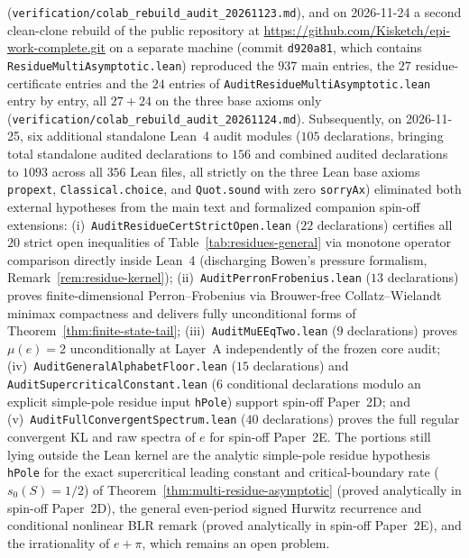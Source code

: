 \documentclass[11pt]{article}
\theoremstyle{definition}
\theoremstyle{remark}
\begin{document}
(\texttt{verification/\allowbreak colab\_\allowbreak rebuild\_\allowbreak audit\_\allowbreak 20261123.md}), and on 2026-11-24 a second clean-clone rebuild of the public repository at \url{https://github.com/Kisketch/epi-work-complete.git} on a separate machine (commit \texttt{d920a81}, which contains \texttt{ResidueMultiAsymptotic.lean}) reproduced the $937$ main entries, the $27$ residue-certificate entries and the $24$ entries of \texttt{AuditResidueMultiAsymptotic.lean} entry by entry, all $27+24$ on the three base axioms only (\texttt{verification/\allowbreak colab\_\allowbreak rebuild\_\allowbreak audit\_\allowbreak 20261124.md}). Subsequently, on 2026-11-25, six additional standalone Lean~4 audit modules ($105$ declarations, bringing total standalone audited declarations to $156$ and combined audited declarations to $1093$ across all $356$ Lean files, all strictly on the three Lean base axioms \texttt{propext}, \texttt{Classical.choice}, and \texttt{Quot.sound} with zero \texttt{sorryAx}) eliminated both external hypotheses from the main text and formalized companion spin-off extensions: (i)~\texttt{AuditResidueCertStrictOpen.lean} ($22$ declarations) certifies all $20$ strict open inequalities of Table~\ref{tab:residues-general} via monotone operator comparison directly inside Lean~4 (discharging Bowen's pressure formalism, Remark~\ref{rem:residue-kernel}); (ii)~\texttt{AuditPerronFrobenius.lean} ($13$ declarations) proves finite-dimensional Perron--Frobenius via Brouwer-free Collatz--Wielandt minimax compactness and delivers fully unconditional forms of Theorem~\ref{thm:finite-state-tail}; (iii)~\texttt{AuditMuEEqTwo.lean} ($9$ declarations) proves $\mu(e)=2$ unconditionally at Layer~A independently of the frozen core audit; (iv)~\texttt{AuditGeneralAlphabetFloor.lean} ($15$ declarations) and \texttt{AuditSupercriticalConstant.lean} ($6$ conditional declarations modulo an explicit simple-pole residue input \texttt{hPole}) support spin-off Paper~2D; and (v)~\texttt{AuditFullConvergentSpectrum.lean} ($40$ declarations) proves the full regular convergent KL and raw spectra of $e$ for spin-off Paper~2E. The portions still lying outside the Lean kernel are the analytic simple-pole residue hypothesis \texttt{hPole} for the exact supercritical leading constant and critical-boundary rate ($s_0(S)=1/2$) of Theorem~\ref{thm:multi-residue-asymptotic} (proved analytically in spin-off Paper~2D), the general even-period signed Hurwitz recurrence and conditional nonlinear BLR remark (proved analytically in spin-off Paper~2E), and the irrationality of $e+\pi$, which remains an open problem.
\end{document}
